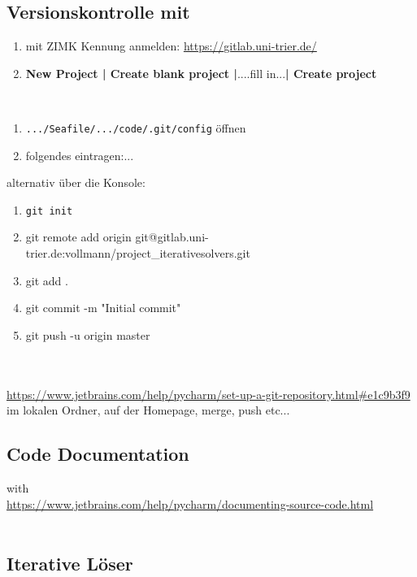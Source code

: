 \subsection{Versionskontrolle mit \git}
\textbf{\gitlab}
\begin{enumerate}
	\item mit ZIMK Kennung anmelden: \url{https://gitlab.uni-trier.de/}
	\item \textbf{New Project | Create blank project |}....fill in...\textbf{| Create project}
\end{enumerate}
~\\
\textbf{\filemanager}
\begin{enumerate}
	\item \texttt{.../Seafile/.../code/.git/config} öffnen
	\item folgendes eintragen:...
\end{enumerate}
alternativ über die Konsole:
\begin{enumerate}
	\item \texttt{git init}
	\item git remote add origin git@gitlab.uni-trier.de:vollmann/project\_iterativesolvers.git
	\item git add .
	\item git commit -m "Initial commit"
	\item git push -u origin master
\end{enumerate}
~\\
\textbf{\pycharm}\\
\url{https://www.jetbrains.com/help/pycharm/set-up-a-git-repository.html#e1c9b3f9}\\
im lokalen Ordner, auf der Homepage, merge, push etc...


\subsection{Code Documentation}
with \textbf{\pycharm}\\
\url{https://www.jetbrains.com/help/pycharm/documenting-source-code.html}
~\\~\\
\subsection{Iterative Löser}